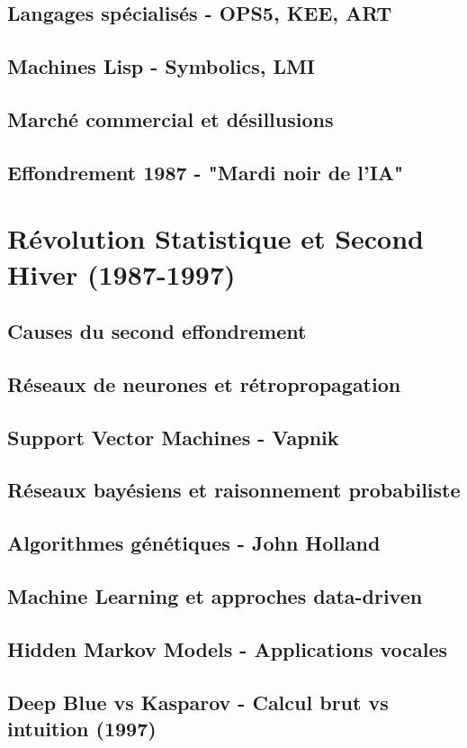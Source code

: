 \documentclass[12pt,a4paper]{book}
\begin{document}
\section{Langages spécialisés - OPS5, KEE, ART}
\section{Machines Lisp - Symbolics, LMI}
\section{Marché commercial et désillusions}
\section{Effondrement 1987 - "Mardi noir de l'IA"}

\chapter{Révolution Statistique et Second Hiver (1987-1997)}
\section{Causes du second effondrement}
\section{Réseaux de neurones et rétropropagation}
\section{Support Vector Machines - Vapnik}
\section{Réseaux bayésiens et raisonnement probabiliste}
\section{Algorithmes génétiques - John Holland}
\section{Machine Learning et approches data-driven}
\section{Hidden Markov Models - Applications vocales}
\section{Deep Blue vs Kasparov - Calcul brut vs intuition (1997)}
\end{document}
